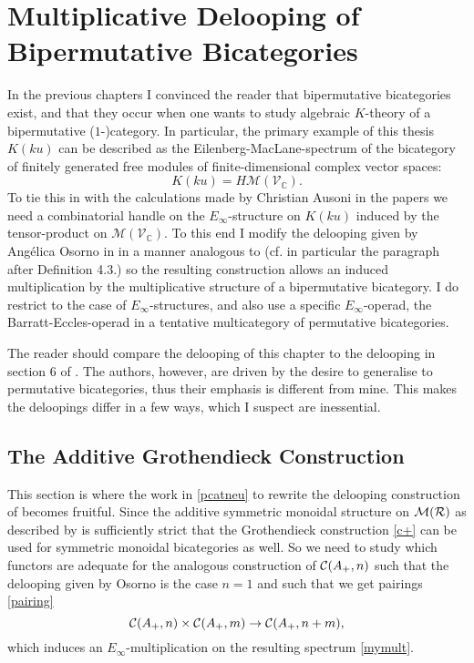 \chapter{Multiplicative Delooping of Bipermutative Bicategories}
\label{multbidel}
In the previous chapters I convinced the reader that bipermutative
bicategories exist, and that they occur when one wants to 
study algebraic $K$-theory of a bipermutative ($1$-)category. 
In particular, the primary example of this thesis $K(ku)$ can be 
described as the Eilenberg-MacLane-spectrum of the bicategory of 
finitely generated free modules of finite-dimensional complex vector 
spaces:\[K(ku)=H\mathcal{M}(\mathcal{V}_\mathbb{C}).\]
To tie this in with the calculations made by Christian Ausoni in the
papers \cite{AuTHH,AuQku,AuKku} we need a combinatorial handle on the 
$E_\infty$-structure on $K(ku)$ induced by the tensor-product on
$\mathcal{M}(\mathcal{V}_\mathbb{C})$. To this end I modify the
delooping given by Ang\'elica Osorno in \cite{Os} in a manner 
analogous to \cite{EM} (cf. in particular the paragraph after
Definition 4.3.) so the resulting construction allows an induced
multiplication by the multiplicative structure of a bipermutative
bicategory.
I do restrict to the case of $E_\infty$-structures, and 
also use a specific $E_\infty$-operad, the Barratt-Eccles-operad 
in a tentative multicategory of permutative bicategories. 

The reader should compare the delooping of this chapter to the
delooping in section 6 of \cite{GJOs}. The authors, however, are
driven by the desire to generalise \cite{Th1} to permutative 
bicategories, thus their emphasis is different from mine. This
makes the deloopings differ in a few ways, which I suspect are
inessential.

\section{The Additive Grothendieck Construction}
This section is where the work in \ref{pcatneu} to rewrite the 
delooping construction of \cite{EM} becomes fruitful. Since the 
additive symmetric monoidal structure on $\mathcal{M}(\mathcal{R})$ as described by
\cite{Os} is sufficiently strict that the Grothendieck construction
\ref{c+} can be used for symmetric monoidal bicategories as well. So
we need to study
which functors are adequate for the analogous construction
of $\mathcal{C}(A_+,n)$ such that the delooping given by Osorno is the
case $n=1$ and such that we get pairings \ref{pairing} \[\mathcal{C}(A_+,n)\times \mathcal{C}(A_+,m)
\rightarrow \mathcal{C}(A_+,n+m),\] which induces an $E_\infty$-multiplication on 
the resulting spectrum \ref{mymult}.

